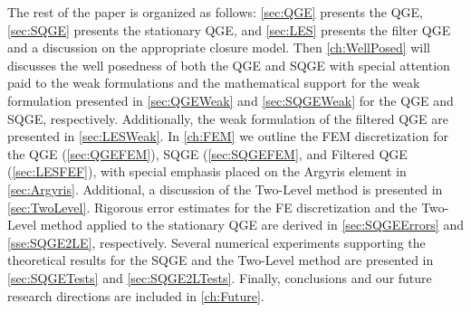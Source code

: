 The rest of the paper is organized as follows: \autoref{sec:QGE} presents the QGE, 
\autoref{sec:SQGE} presents the stationary QGE, and \autoref{sec:LES} presents the filter QGE and
a discussion on the appropriate closure model. Then \autoref{ch:WellPosed} will discusses the well
posedness of both the QGE and SQGE with special attention paid to the weak formulations and the
mathematical support for the weak formulation presented in \autoref{sec:QGEWeak} and
\autoref{sec:SQGEWeak} for the QGE and SQGE, respectively. Additionally, the weak formulation of the
filtered QGE are presented in \autoref{sec:LESWeak}. In \autoref{ch:FEM} we outline the FEM
discretization for the QGE (\autoref{sec:QGEFEM}), SQGE (\autoref{sec:SQGEFEM}, and Filtered QGE
(\autoref{sec:LESFEF}), with special emphasis placed on the Argyris element in
\autoref{sec:Argyris}. Additional, a discussion of the Two-Level method is presented in
\autoref{sec:TwoLevel}. Rigorous error estimates for the FE discretization and the Two-Level method
applied to the stationary QGE are derived in \autoref{sec:SQGEErrors} and \autoref{sse:SQGE2LE},
respectively. Several numerical experiments supporting the theoretical results for the SQGE and the
Two-Level method are presented in \autoref{sec:SQGETests} and \autoref{sec:SQGE2LTests}. Finally,
conclusions and our future research directions are included in \autoref{ch:Future}.



